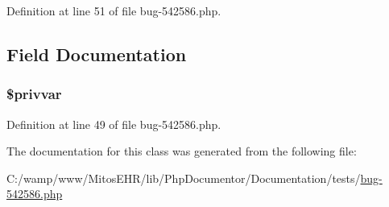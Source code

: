 \-Definition at line 51 of file bug-\/542586.\-php.


\begin{DoxyCode}
        {
        }
\end{DoxyCode}


\subsection{\-Field \-Documentation}
\hypertarget{classpriv_a14b668de34532bd98341375222f0f6c2}{
\subsubsection[{\$privvar}]{\setlength{\rightskip}{0pt plus 5cm}\$privvar}}\label{classpriv_a14b668de34532bd98341375222f0f6c2}


\-Definition at line 49 of file bug-\/542586.\-php.



\-The documentation for this class was generated from the following file\-:\begin{DoxyCompactItemize}
\item 
\-C\-:/wamp/www/\-Mitos\-E\-H\-R/lib/\-Php\-Documentor/\-Documentation/tests/\hyperlink{bug-542586_8php}{bug-\/542586.\-php}\end{DoxyCompactItemize}
